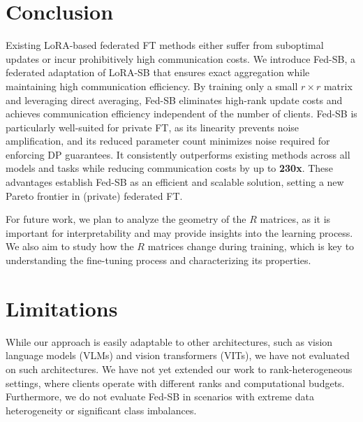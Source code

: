 \section{Conclusion} \label{conclusion}
Existing LoRA-based federated FT methods either suffer from suboptimal updates or incur prohibitively high communication costs.  
We introduce Fed-SB, a federated adaptation of LoRA-SB that ensures exact aggregation while maintaining high communication efficiency.  
By training only a small \( r \times r \) matrix and leveraging direct averaging, Fed-SB eliminates high-rank update costs and achieves communication efficiency independent of the number of clients.  
Fed-SB is particularly well-suited for private FT, as its linearity prevents noise amplification, and its reduced parameter count minimizes noise required for enforcing DP guarantees. 
It consistently outperforms existing methods across all models and tasks while reducing communication costs by up to \textbf{230x}.  
These advantages establish Fed-SB as an efficient and scalable solution, setting a new Pareto frontier in (private) federated FT.

For future work, we plan to analyze the geometry of the \( R \) matrices, as it is important for interpretability and may provide insights into the learning process.  
We also aim to study how the \( R \) matrices change during training, which is key to understanding the fine-tuning process and characterizing its properties.


\section{Limitations}\label{limitations}

While our approach is easily adaptable to other architectures, such as vision language models (VLMs) and vision transformers (VITs), we have not evaluated on such architectures.  
We have not yet extended our work to rank-heterogeneous settings, where clients operate with different ranks and computational budgets.  
Furthermore, we do not evaluate Fed-SB in scenarios with extreme data heterogeneity or significant class imbalances.

